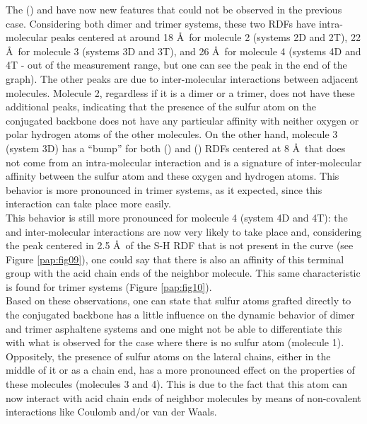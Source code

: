The  () and  have now new features that could not be observed in the previous case. Considering both dimer and trimer systems, these two RDFs have intra-molecular peaks centered at around 18 \AA~for molecule 2 (systems 2D and 2T), 22 \AA~for molecule 3 (systems 3D and 3T), and 26 \AA~for molecule 4 (systems 4D and 4T - out of the measurement range, but one can see the peak in the end of the graph). The other peaks are due to inter-molecular interactions between adjacent molecules. Molecule 2, regardless if it is a dimer or a trimer, does not have these additional peaks, indicating that the presence of the sulfur atom on the conjugated backbone does not have any particular affinity with neither oxygen or polar hydrogen atoms of the other molecules. On the other hand, molecule 3 (system 3D) has a ``bump'' for both  () and  () RDFs centered at 8 \AA~that does not come from an intra-molecular interaction and is a signature of inter-molecular affinity between the sulfur atom and these oxygen and hydrogen atoms. This behavior is more pronounced in trimer systems, as it expected, since this interaction can take place more easily.\\

This behavior is still more pronounced for molecule 4 (system 4D and 4T): the  and  inter-molecular interactions are now very likely to take place and, considering the peak centered in 2.5 \AA~of the S-H RDF that is not present in the  curve (see Figure \ref{pap:fig09}), one could say that there is also an affinity of this terminal  group with the acid chain ends of the neighbor molecule. This same characteristic is found for trimer systems (Figure \ref{pap:fig10}).\\

Based on these observations, one can state that sulfur atoms grafted directly to the conjugated backbone has a little influence on the dynamic behavior of dimer and trimer asphaltene systems and one might not be able to differentiate this with what is observed for the case where there is no sulfur atom (molecule 1). Oppositely, the presence of sulfur atoms on the lateral chains, either in the middle of it or as a chain end, has a more pronounced effect on the properties of these molecules (molecules 3 and 4). This is due to the fact that this atom can now interact with acid chain ends of neighbor molecules by means of non-covalent interactions like Coulomb and/or van der Waals.\\

